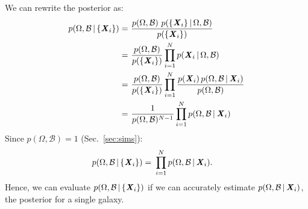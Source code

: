 We can rewrite the posterior as: 
\begin{align}
p(\Omega, \mathcal{B} \,|\, \{{\textbf{\textit{X}}_i}\}) 
    =&~\frac{p(\Omega, \mathcal{B})~p(\{{\textbf{\textit{X}}_i}\} \,|\, \Omega,
    \mathcal{B})}{p(\{{\textbf{\textit{X}}_i}\})}\\
    =&~\frac{p(\Omega, \mathcal{B})}{p(\{\textbf{\textit{X}}_i\})}\prod\limits_{i=1}^N 
    p({\textbf{\textit{X}}_i}\,|\, \Omega, \mathcal{B})\\
    =&~\frac{p(\Omega, \mathcal{B})}{p(\{\textbf{\textit{X}}_i\})}\prod\limits_{i=1}^N 
    \frac{p(\textbf{\textit{X}}_i)\,p(\Omega, \mathcal{B}\,|\,{\textbf{\textit{X}}_i})}{p(\Omega,
    \mathcal{B})}\\
    =&~\frac{1}{p(\Omega, \mathcal{B})^{N-1}}\prod\limits_{i=1}^N p(\Omega,
    \mathcal{B}\,|\, {\textbf{\textit{X}}_i})
\end{align} 
Since $p(\Omega, \mathcal{B}) = 1$ (Sec.~\ref{sec:sims}):
\begin{align}
p(\Omega, \mathcal{B} \,|\, \{{\textbf{\textit{X}}_i}\}) 
    =&~\prod\limits_{i=1}^N p(\Omega, \mathcal{B}\,|\, {\textbf{\textit{X}}_i}).
    \label{eq:posterior}
\end{align} 
Hence, we can evaluate $p(\Omega, \mathcal{B} \,|\, \{{\textbf{\textit{X}}_i}\})$ if we can
accurately estimate $p(\Omega, \mathcal{B}\,|\, {\textbf{\textit{X}}_i})$, the posterior
for a single galaxy. 


